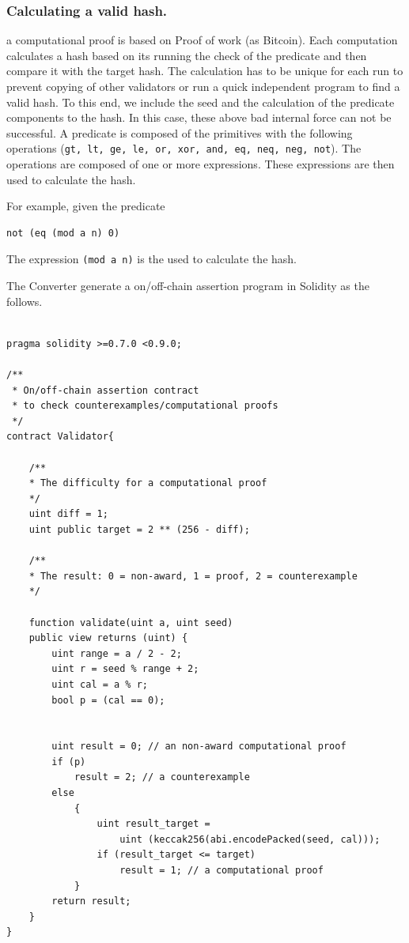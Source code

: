 \documentclass[runningheads]{llncs}
\begin{document}
\subsubsection{Calculating a valid hash.} a computational proof is based on Proof of work (as Bitcoin). Each computation calculates a hash based on its running the check of the predicate and then compare it with the target hash. The calculation has to be unique for each run to prevent copying of other validators or run a quick independent program to find a valid hash. To this end, we include the seed and the calculation of the predicate components to the hash. In this case, these above bad internal force can not be successful. A predicate is composed of the primitives with the following operations (\texttt{gt, lt, ge, le, or, xor, and, eq, neq, neg, not}). The operations are composed of one or more expressions. These expressions are then used to calculate the hash.

For example, given the predicate 

\begin{lstlisting}[numbers=none]
not (eq (mod a n) 0)
\end{lstlisting}

\noindent The expression \texttt{(mod a n)} is the used to calculate the hash.

The Converter generate a on/off-chain assertion program in Solidity as the follows.

\begin{lstlisting}[numbers=none]

pragma solidity >=0.7.0 <0.9.0;

/**
 * On/off-chain assertion contract 
 * to check counterexamples/computational proofs
 */
contract Validator{

    /**
    * The difficulty for a computational proof
    */
    uint diff = 1;
    uint public target = 2 ** (256 - diff); 

    /**
    * The result: 0 = non-award, 1 = proof, 2 = counterexample
    */

    function validate(uint a, uint seed) 
    public view returns (uint) {
        uint range = a / 2 - 2; 
        uint r = seed % range + 2;
        uint cal = a % r;
        bool p = (cal == 0);
        

        uint result = 0; // an non-award computational proof 
        if (p)  
            result = 2; // a counterexample
        else 
            {
                uint result_target = 
                    uint (keccak256(abi.encodePacked(seed, cal)));
                if (result_target <= target) 
                    result = 1; // a computational proof    
            }
        return result;           
    }
}

\end{lstlisting}
\end{document}
